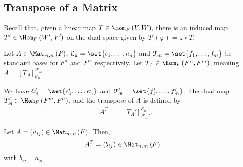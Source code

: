 \documentclass[10pt]{mypackage}
\begin{document}
\subsection{Transpose of a Matrix}%
Recall that, given a linear map $T\in \Hom_{F}\left(V,W\right)$, there is an induced map $T'\in \Hom_{F}\left(W',V'\right)$ on the dual space given by $T'\left(\varphi\right) = \varphi\circ T$.\newline

Let $A\in \Mat_{m,n}\left(F\right)$, $\mathcal{E}_n = \set{e_1,\dots,e_n}$ and $\mathcal{F}_m = \set{f_1,\dots,f_m}$ be standard bases for $F^n$ and $F^m$ respectively. Let $T_A \in \Hom_F\left(F^n,F^m\right)$, meaning $A = \left[T_A\right]_{\mathcal{E}_n}^{\mathcal{F}_m}$.\newline

We have $\mathcal{E}_n' = \set{e_1',\dots,e_n'}$ and $\mathcal{F}_{m}' = \set{f_1',\dots,f_m'}$. The dual map $T_A'\in \Hom_{F}\left(F^m,F^n\right)$, and the transpose of $A$ is defined by
\begin{align*}
  A^{T} &= \left[T_{A}'\right]_{\mathcal{F}_m'}^{\mathcal{E}_n'}.
\end{align*}
\begin{lemma}
  Let $A = \left(a_{ij}\right) \in \Mat_{m,n}\left(F\right)$. Then,
  \begin{align*}
    A^{T} &= \left(b_{ij}\right)\in \Mat_{n,m}\left(F\right)
  \end{align*}
  with $b_{ij} = a_{ji}$.
\end{lemma}
\end{document}
